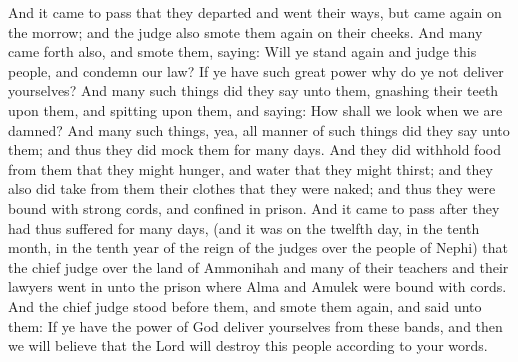 And it came to pass that they departed and went their ways, but came again on the morrow; and the judge also smote them again on their cheeks. And many came forth also, and smote them, saying: Will ye stand again and judge this people, and condemn our law? If ye have such great power why do ye not deliver yourselves?
\bverse \iffalse And many such things did they say unto them, gnashing their teeth upon them, and spitting upon them, and saying: How shall we look when we are damned? \fi
And many such things did they say unto them, gnashing their teeth upon them, and spitting upon them, and saying: How shall we look when we are damned?
\bverse \iffalse And many such things, yea, all manner of such things did they say unto them; and thus they did mock them for many days. And they did withhold food from them that they might hunger, and water that they might thirst; and they also did take from them their clothes that they were naked; and thus they were bound with strong cords, and confined in prison. \fi
And many such things, yea, all manner of such things did they say unto them; and thus they did mock them for many days. And they did withhold food from them that they might hunger, and water that they might thirst; and they also did take from them their clothes that they were naked; and thus they were bound with strong cords, and confined in prison.
\bverse \iffalse And it came to pass after they had thus suffered for many days, (and it was on the twelfth day, in the tenth month, in the tenth year of the reign of the judges over the people of Nephi) that the chief judge over the land of Ammonihah and many of their teachers and their lawyers went in unto the prison where Alma and Amulek were bound with cords. \fi
And it came to pass after they had thus suffered for many days, (and it was on the twelfth day, in the tenth month, in the tenth year of the reign of the judges over the people of Nephi) that the chief judge over the land of Ammonihah and many of their teachers and their lawyers went in unto the prison where Alma and Amulek were bound with cords.
\bverse \iffalse And the chief judge stood before them, and smote them again, and said unto them: If ye have the power of God deliver yourselves from these bands, and then we will believe that the Lord will destroy this people according to your words. \fi
And the chief judge stood before them, and smote them again, and said unto them: If ye have the power of God deliver yourselves from these bands, and then we will believe that the Lord will destroy this people according to your words.

